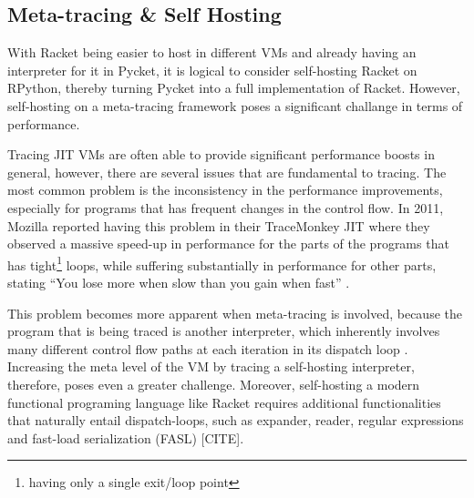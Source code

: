 \subsection{Meta-tracing \& Self Hosting}
\label{subsec:self-hosting-problem}

With Racket being easier to host in different VMs and already having
an interpreter for it in Pycket, it is logical to consider
self-hosting Racket on RPython, thereby turning Pycket into a full
implementation of Racket. However, self-hosting on a meta-tracing
framework poses a significant challange in terms of performance.

Tracing JIT VMs are often able to provide significant performance
boosts in general, however, there are several issues that are
fundamental to tracing. The most common problem is the inconsistency
in the performance improvements, especially for programs that has
frequent changes in the control flow. In 2011, Mozilla reported having
this problem in their TraceMonkey JIT where they observed a massive
speed-up in performance for the parts of the programs that has
tight\footnote{having only a single exit/loop point} loops, while
suffering substantially in performance for other parts, stating ``You
lose more when slow than you gain when fast'' \cite{mozblog}.

This problem becomes more apparent when meta-tracing is involved,
because the program that is being traced is another interpreter, which
inherently involves many different control flow paths at each
iteration in its dispatch loop \cite{bolz15-meta-vm}. Increasing the
meta level of the VM by tracing a self-hosting interpreter, therefore,
poses even a greater challenge. Moreover, self-hosting a modern
functional programing language like Racket requires additional
functionalities that naturally entail dispatch-loops, such as
expander, reader, regular expressions and fast-load serialization
(FASL) [CITE].
